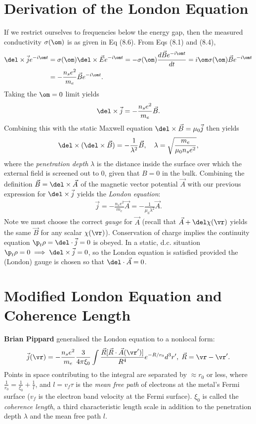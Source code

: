\documentclass[a4paper, 11pt, normalem]{report}
\begin{document}
\section{Derivation of the London Equation}
If we restrict ourselves to frequencies below the energy gap, then the measured conductivity $\sigma(\om)$ is as given in Eq (8.6).
From Eqs (8.1) and (8.4),
\begin{align}
    \del\times\vec{j}e^{-i\om t} &= \sigma(\om)\del\times\vec{E}e^{-i\om t} = -\sigma(\om)\frac{d\vec{B}e^{-i\om t}}{dt} = i\om\sigma(\om)\vec{B}e^{-i\om t} \\
                                 &= -\frac{n_se^2}{m_e}\vec{B}e^{-i\om t}.
\end{align}
Taking the $\om=0$ limit yields
\begin{align}
    \del\times\vec{j}=-\frac{n_se^2}{m_e}\vec{B}.
\end{align}
Combining this with the static Maxwell equation $\del\times\vec{B}=\mu_0\vec{j}$ then yields
\begin{align}
    \del\times(\del\times\vec{B}) = -\frac{1}{\lambda^2}\vec{B},\quad \lambda = \sqrt{\frac{m_e}{\mu_0n_se^2}},
\end{align}
where the \emph{penetration depth} $\lambda$ is the distance inside the surface over which the external field is screened out to 0, given that $B=0$ in the bulk.
Combining the definition $\vec{B}=\del\times\vec{A}$ of the magnetic vector potential $\vec{A}$ with our previous expression for $\del\times\vec{j}$ yields the \emph{London equation}:
\begin{align}
    \vec{j} = -\frac{n_se^2}{m_e}\vec{A} = -\frac{1}{\mu_0\lambda^2}\vec{A}.
\end{align}
Note we must choose the correct \emph{gauge} for $\vec{A}$ (recall that $\vec{A}+\del\chi(\vr)$ yields the same $\vec{B}$ for any scalar $\chi(\vr)$).
Conservation of charge implies the continuity equation $\p_t\rho=\del\cdot\vec{j}=0$ is obeyed.
In a static, d.c. situation $\p_t\rho=0\implies\del\times\vec{j}=0$, so the London equation is satisfied provided the (London) gauge is chosen so that $\del\cdot\vec{A}=0$.

\section{Modified London Equation and Coherence Length}
\textbf{Brian Pippard} generalised the London equation to a nonlocal form:
\begin{align}
    \vec{j}(\vr) = -\frac{n_se^2}{m_e}\frac{3}{4\pi\xi_0}\int \frac{\vec{R}[\vec{R}\cdot\vec{A}(\vr')]}{R^4}e^{-R/r_0}d^3r',\; \vec{R}=\vr-\vr'.
\end{align}
Points in space contributing to the integral are separated by $\approx r_0$ or less, where $\frac{1}{r_0}=\frac{1}{\xi_0}+\frac{1}{l}$, and $l=v_f\tau$ is the \emph{mean free path} of electrons at the metal's Fermi surface ($v_f$ is the electron band velocity at the Fermi surface).
$\xi_0$ is called the \emph{coherence length}, a third characteristic length scale in addition to the penetration depth $\lambda$ and the mean free path $l$.
\end{document}
